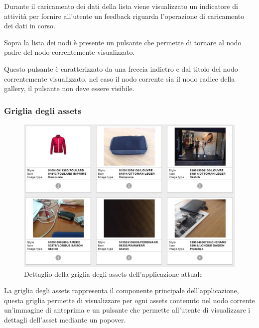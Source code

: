 Durante il caricamento dei dati della lista viene visualizzato un indicatore di attività per fornire all'utente un feedback riguarda l'operazione di caricamento dei dati in corso.

Sopra la lista dei nodi è presente un pulsante che permette di tornare al nodo padre del nodo correntemente visualizzato.

Questo pulsante è caratterizzato da una freccia indietro e dal titolo del nodo correntemente visualizzato, nel caso il nodo corrente sia il nodo radice della gallery, il pulsante non deve essere visibile.

\subsubsection{Griglia degli assets}

\begin{figure}[htp]
\centering
\includegraphics[width=\textwidth]{../immagini/warda-gallery-griglia}
\caption{Dettaglio della griglia degli assets dell'applicazione attuale}  
\end{figure}

La griglia degli assets rappresenta il componente principale dell'applicazione, questa griglia permette di visualizzare per ogni assets contenuto nel nodo corrente un'immagine di anteprima e un pulsante che permette all'utente di visualizzare i dettagli dell'asset mediante un popover.

